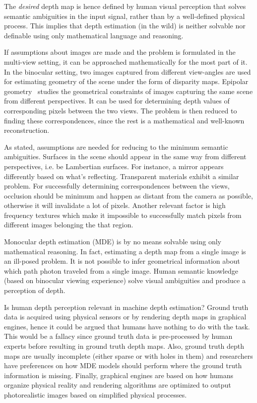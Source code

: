 The \textit{desired} depth map is hence defined by human visual perception that solves semantic ambiguities in the input signal, rather than by a well-defined physical process.
This implies that depth estimation (in the wild) is neither solvable nor definable using only mathematical language and reasoning.

\vspace{1cm}

If assumptions about images are made and the problem is formulated in the multi-view setting, it can be approached mathematically for the most part of it.
In the binocular setting, two images captured from different view-angles are used for estimating geometry of the scene under the form of disparity maps.
Epipolar geometry~\cite{multiview} studies the geometrical constraints of images capturing the same scene from different perspectives.
It can be used for determining depth values of corresponding pixels between the two views.
The problem is then reduced to finding these correspondences, since the rest is a mathematical and well-known reconstruction.

As stated, assumptions are needed for reducing to the minimum semantic ambiguities.
Surfaces in the scene should appear in the same way from different perspectives, i.e. be Lambertian surfaces.
For instance, a mirror appears differently based on what's reflecting.
Transparent materials exhibit a similar problem.
For successfully determining correspondences between the views, occlusion should be minimum and happen as distant from the camera as possible, otherwise it will invalidate a lot of pixels.
Another relevant factor is high frequency textures which make it impossible to successfully match pixels from different images belonging the that region.

\vspace{1cm}

Monocular depth estimation (MDE) is by no means solvable using only mathematical reasoning.
In fact, estimating a depth map from a single image is an ill-posed problem.
It is not possible to infer geometrical information about which path photon traveled from a single image.
Human semantic knowledge (based on binocular viewing experience) solve visual ambiguities and produce a perception of depth.

Is human depth perception relevant in machine depth estimation?
Ground truth data is acquired using physical sensors or by rendering depth maps in graphical engines, hence it could be argued that humans have nothing to do with the task.
This would be a fallacy since ground truth data is pre-processed by human experts before resulting in ground truth depth maps.
Also, ground truth depth maps are usually incomplete (either sparse or with holes in them) and researchers have preferences on how MDE models should perform where the ground truth information is missing.
Finally, graphical engines are based on how humans organize physical reality and rendering algorithms are optimized to output photorealistic images based on simplified physical processes.

